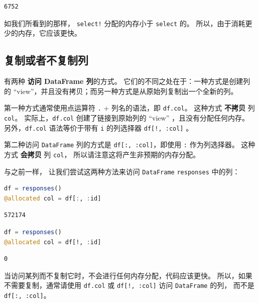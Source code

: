 \documentclass[
  notoc %
]{tufte-book}
\newcommand{\passthrough}[1]{#1}
\begin{document}
\begin{lstlisting}
6752
\end{lstlisting}

如我们所看到的那样， \passthrough{\lstinline"select!"} 分配的内存小于
\passthrough{\lstinline!select!} 的。
所以，由于消耗更少的内存，它应该更快。

\hypertarget{sec:df_performance_df_copy}{%
\subsection{复制或者不复制列}\label{sec:df_performance_df_copy}}

有两种 \textbf{访问 DataFrame 列}的方式。
它们的不同之处在于：一种方式是创建列的
``view''，并且没有拷贝；而另一种方式是从原始列复制出一个全新的列。

第一种方式通常使用点运算符 \passthrough{\lstinline!.!} + 列名的语法，即
\passthrough{\lstinline!df.col!}。 这种方式 \textbf{不拷贝} 列
\passthrough{\lstinline!col!}。 实际上，\passthrough{\lstinline!df.col!}
创建了链接到原始列的 ``view'' ，且没有分配任何内存。
另外，\passthrough{\lstinline!df.col!} 语法等价于带有
\passthrough{\lstinline!i!} 的列选择器
\passthrough{\lstinline"df[!, :col]"} 。

第二种访问 \passthrough{\lstinline!DataFrame!} 列的方式是
\passthrough{\lstinline!df[:, :col]!}，即使用
\passthrough{\lstinline!:!} 作为列选择器。 这种方式 \textbf{会拷贝} 列
\passthrough{\lstinline!col!}， 所以请注意这将产生非预期的内存分配。

与之前一样， 让我们尝试这两种方法来访问
\passthrough{\lstinline!DataFrame!} \passthrough{\lstinline!responses!}
中的列：

\begin{lstlisting}[language=Julia]
df = responses()
@allocated col = df[:, :id]
\end{lstlisting}

\begin{lstlisting}
572174
\end{lstlisting}

\begin{lstlisting}[language=Julia]
df = responses()
@allocated col = df[!, :id]
\end{lstlisting}

\begin{lstlisting}
0
\end{lstlisting}

当访问某列而不复制它时，不会进行任何内存分配，代码应该更快。
所以，如果不需要复制，通常请使用 \passthrough{\lstinline!df.col!} 或
\passthrough{\lstinline"df[!, :col]"} 访问
\passthrough{\lstinline!DataFrame!} 的列， 而不是
\passthrough{\lstinline!df[:, :col]!}。
\end{document}
